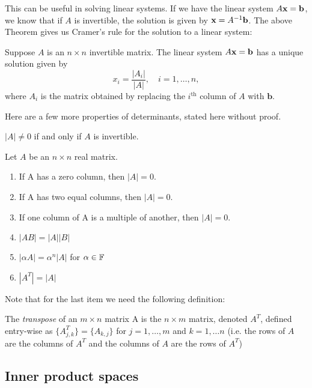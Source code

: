 \documentclass{article}
\begin{document}
This can be useful in solving linear systems. If we have the linear system $A{\mathbf{x}} = \mathbf{b}$, we know that if $A$ is invertible, the solution is given by ${\mathbf{x}} = A^{-1} \mathbf{b}$. The above Theorem gives us Cramer's rule for the solution to a linear system:
\begin{corollary}
Suppose $A$ is an $n \times n$ invertible matrix. The linear system $A{\mathbf{x}} = \mathbf{b}$ has a unique solution given by
\begin{equation*}
    x_i = \frac{|A_i|}{|A|}, \quad i = 1, \ldots, n,
\end{equation*}
where $A_i$ is the matrix obtained by replacing the $i^\text{th}$ column of $A$ with $\mathbf{b}$.
\end{corollary}

Here are a few more properties of determinants, stated here without proof.

\begin{proposition}
\label{prop:A_invertible}
$|A| \neq 0$ if and only if $A$ is invertible.
\end{proposition}

\begin{proposition}
Let $A$ be an $n \times n$ real matrix.
\begin{enumerate}
    \item If A has a zero column, then $|A| = 0$.
\item If A has two equal columns, then $|A| = 0$.
\item If one column of A is a multiple of another, then $|A| = 0$.
\item $|AB| = |A| |B|$
\item $|\alpha A| = \alpha^n |A|$ for $\alpha \in {\mathbb{F}}$
\item $|A^T| = |A|$
\end{enumerate}
\end{proposition}

Note that for the last item we need the following definition:

\begin{definition}
The \emph{transpose} of an $m \times n$ matrix A is the $n \times m$ matrix, denoted $A^T$, defined entry-wise as $\{A^T_{j,k}\} = \{A_{k,j}\}$ for $j=1,\ldots,m$ and $k=1,\ldots n$ (i.e. the rows of $A$ are the columns of $A^T$ and the columns of $A$ are the rows of $A^T$)
\end{definition}



\subsection{Inner product spaces}
\end{document}
